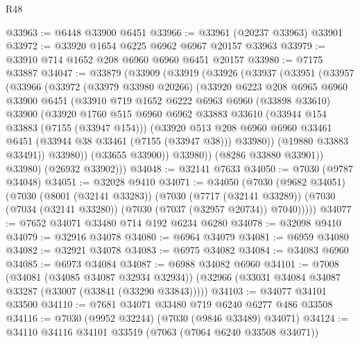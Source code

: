 \begin{lexlean}{R48}
\begin{coremodule}
@33963 := @6448 @33900 @6451
@33966 := @33961 (@20237 @33963) @33901
@33972 := @33920 @1654 @6225 @6962 @6967 @20157 @33963
@33979 := @33910 @714 @1652 @208 @6960 @6960 @6451 @20157
@33980 := @7175 @33887
@34047 := @33879
    (@33909
      (@33919
        (@33926
          (@33937
            (@33951
              (@33957
                (@33966
                  (@33972
                    (@33979 @33980 @20266)
                    (@33920
                      @6223
                      @208
                      @6965
                      @6960
                      @33900
                      @6451
                      (@33910
                        @719
                        @1652
                        @6222
                        @6963
                        @6960
                        (@33898 @33610)
                        @33900
                        (@33920
                          @1760
                          @515
                          @6960
                          @6962
                          @33883
                          @33610
                          (@33944 @154 @33883 (@7155 (@33947 @154)))
                          (@33920
                            @513
                            @208
                            @6960
                            @6960
                            @33461
                            @6451
                            (@33944 @38 @33461 (@7155 (@33947 @38)))
                            @33980))
                        (@19880 @33883 @33491))
                      @33980))
                  (@33655 @33900))
                @33980))
            (@8286 @33880 @33901))
          @33980)
        (@26932 @33902)))
@34048 := @32141 @7633
@34050 := @7030 (@9787 @34048)
@34051 := @32028 @9410
@34071 := @34050
    (@7030
      (@9682 @34051)
      (@7030
        (@8001 (@32141 @33283))
        (@7030
          (@7717 (@32141 @33289))
          (@7030 (@7034 (@32141 @33280)) (@7030 (@7037 (@32957 @20734)) @7040)))))
@34077 := @7652 @34071 @33480 @714 @192 @6234 @6280
@34078 := @32098 @9410
@34079 := @32916 @34078
@34080 := @6964 @34079
@34081 := @6959 @34080
@34082 := @32921 @34078
@34083 := @6975 @34082
@34084 := @34083 @6960
@34085 := @6973 @34084
@34087 := @6988 @34082 @6960
@34101 := @7008
    (@34081 (@34085 @34087 @32934 @32934))
    (@32966 (@33031 @34084 @34087 @33287 (@33007 (@33841 (@33290 @33843)))))
@34103 := @34077 @34101 @33500
@34110 := @7681 @34071 @33480 @719 @6240 @6277 @486 @33508
@34116 := @7030 (@9952 @32244) (@7030 (@9846 @33489) @34071)
@34124 := @34110 @34116 @34101 @33519 (@7063 (@7064 @6240 @33508 @34071))

\end{coremodule}
\end{lexlean}
